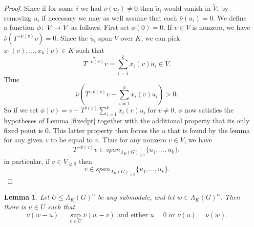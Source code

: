 \documentclass{amsart}
\theoremstyle{plain}
\newtheorem{lemma}[theorem]{Lemma}
\theoremstyle{definition}
\theoremstyle{remark}
\def\co{\colon\thinspace}
\def\barnu{\bar{\nu}}
\begin{document}
\begin{proof} Since if for some $i$ we had $\barnu(u_i)\neq 0$ then $\tilde{u}_i$ would vanish in $\tilde{V}$, by removing $u_i$ if necessary we may as well assume that each $\barnu(u_i)=0$.  We define a function $\phi\co V\to V$ as follows.  First set $\phi(0)=0$.  If $v\in V$ is nonzero, we have $\barnu(T^{-\barnu(v)}v)=0$.  Since the $\tilde{u}_i$ span $\tilde{V}$ over $K$, we can pick $x_1(v),\ldots,x_k(v)\in K$ such that \[ \widetilde{T^{-\barnu(v)}v}=\sum_{i=1}^{k}x_i(v)\tilde{u}_i\in \tilde{V}.\]  Thus \[ \barnu(T^{-\barnu(v)}v-\sum_{i=1}^{k}x_i(v)u_i)>0.\]  So if we set $\phi(v)=v-T^{\barnu(v)}\sum_{i=1}^{k}x_i(v)u_i$ for $v\neq 0$, $\phi$ now satisfies the hypotheses of Lemma \ref{fixedpt} together with the additional property that its only fixed point is $0$.  This latter property then forces the $u$ that is found by the lemma for any given $v$ to be equal to $v$.  Thus for any nonzero $v\in V$, we have \[ T^{-\barnu(v)}v\in span_{\Lambda_K(G)_{\geq 0}}\{u_1,\ldots,u_k\};\] in particular, if $v\in V_{\geq 0}$ then \[ v\in span_{\Lambda_K(G)_{\geq 0}}\{u_1,\ldots,u_k\}.\]
\end{proof}

\begin{lemma}\label{tzero} Let $U\leq \Lambda_K(G)^n$ be any submodule, and let $w\in \Lambda_K(G)^n$.  Then there is $u\in U$ such that \[ \barnu(w-u)=\sup_{v\in U}\barnu(w-v)\mbox{ and either }u=0 \mbox{ or } \barnu(u)=\barnu(w).\]
\end{lemma}
\end{document}
